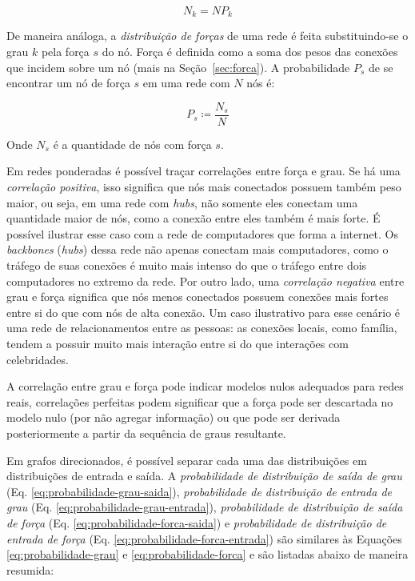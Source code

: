 \documentclass[12pt,a4paper]{article}
\theoremstyle{hypo}
\newcommand{\defn}{\coloneqq} %
\begin{document}
\begin{equation}
N_k = NP_k
\end{equation} 

De maneira análoga, a \textit{distribuição de forças} de uma rede é feita substituindo-se o grau $k$ pela força $s$ do nó. Força é definida como a soma dos pesos das conexões que incidem sobre um nó (mais na Seção~\ref{sec:forca}). A probabilidade $P_s$ de se encontrar um nó de força $s$ em uma rede com $N$ nós é:

\begin{equation} \label{eq:probabilidade-forca}
P_s \defn \frac{N_s}{N}
\end{equation}

Onde $N_s$ é a quantidade de nós com força $s$.

Em redes ponderadas é possível traçar correlações entre força e grau. Se há uma \textit{correlação positiva}, isso significa que nós mais conectados possuem também peso maior, ou seja, em uma rede com \textit{hubs}, não somente eles conectam uma quantidade maior de nós, como a conexão entre eles também é mais forte. É possível ilustrar esse caso com a rede de computadores que forma a internet. Os \textit{backbones} (\textit{hubs}) dessa rede não apenas conectam mais computadores, como o tráfego de suas conexões é muito mais intenso do que o tráfego entre dois computadores no extremo da rede. Por outro lado, uma \textit{correlação negativa} entre grau e força significa que nós menos conectados possuem conexões mais fortes entre si do que com nós de alta conexão. Um caso ilustrativo para esse cenário é uma rede de relacionamentos entre as pessoas: as conexões locais, como família, tendem a possuir muito mais interação entre si do que interações com celebridades.

A correlação entre grau e força pode indicar modelos nulos adequados para redes reais, correlações perfeitas podem significar que a força pode ser descartada no modelo nulo (por não agregar informação) ou que pode ser derivada posteriormente a partir da sequência de graus resultante.

Em grafos direcionados, é possível separar cada uma das distribuições em distribuições de entrada e saída. A \textit{probabilidade de distribuição de saída de grau} (Eq. \ref{eq:probabilidade-grau-saida}), \textit{probabilidade de distribuição de entrada de grau} (Eq. \ref{eq:probabilidade-grau-entrada}), \textit{probabilidade de distribuição de saída de força} (Eq. \ref{eq:probabilidade-forca-saida}) e \textit{probabilidade de distribuição de entrada de força} (Eq. \ref{eq:probabilidade-forca-entrada}) são similares às Equações \ref{eq:probabilidade-grau} e \ref{eq:probabilidade-forca} e são listadas abaixo de maneira resumida:
\end{document}
